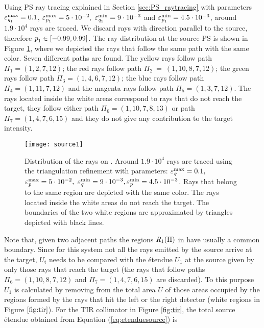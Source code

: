 Using PS ray tracing explained in Section \ref{sec:PS_raytracing} with parameters $\varepsilon_{\textit{q}_1}^{\textrm{max}} = 0.1$, $ \varepsilon_{\textit{p}_1}^\textrm{max} = 5\cdot 10^{-2}, $ $\varepsilon_{\textit{q}_1}^\textrm{min} = 9\cdot 10^{-3}$ and $\varepsilon_{\textit{p}_1}^\textrm{min} = 4.5 \cdot 10^{-3}$, around $1.9 \cdot 10^4$ rays are traced. 
We discard rays with direction parallel to the source, therefore $\textit{p}_1 \in [-0.99, 0.99]$. The ray distribution at the source PS  is shown in Figure \ref{fig:sourcePS}, where we depicted the rays that follow the same path with the same color. Seven different paths are found. The yellow rays follow path $\Pi_1 = (1, 2, 7, 12)$;
   the red rays follow path $\Pi_2 ~= ~(1, 10, 8, 7, 12)$; the green rays follow path $\Pi_3 = (1, 4, 6, 7, 12)$;
   the blue rays follow path $\Pi_4= (1, 11, 7, 12)$ and the magenta rays follow path $\Pi_5= (1, 3, 7, 12)$. The rays located inside the white areas correspond to rays that do not reach the target, they follow either path $\Pi_6 = (1, 10, 7, 8, 13)$ or path $\Pi_7 = (1,4,7,6,15)$ and they do not give any contribution to the target intensity.
\begin{figure}[h]
  \begin{center}
  \texttt{[image: source1]}
  \end{center}
  \caption{Distribution of the rays on . Around $1.9 \cdot 10^4$ rays are traced using the triangulation refinement with parameters:
  $\varepsilon_{\textit{q}}^\textrm{max} = 0.1 ,$ $ \varepsilon_{\textit{p}}^\textrm{max} = 5\cdot 10^{-2}, $ $\varepsilon_{\textit{q}}^\textrm{min} = 9\cdot 10^{-3}, \varepsilon_{\textit{p}}^\textrm{min} = 4.5 \cdot 10^{-3}$. Rays that belong to the same region are depicted with the same color. The rays located inside the white areas do not reach the target. The boundaries of the two white regions are approximated by triangles depicted with black lines.}
  \label{fig:sourcePS}
\end{figure}
Note that, given two adjacent paths the regions $\mbox{$\emph{R}_{\textit{$1$}}$}(\Pi)$ in  have usually a common boundary. 
Since for this system not all the rays emitted by the source arrive at the target, $U_{\textrm{t}}$ needs to be compared with the \'{e}tendue $U_1$ at the source given by only those rays that reach the target (the rays that follow paths $\Pi_6=(1,10,8,7,12)$ and 
$\Pi_7 = (1,4,7,6,15)$ are discarded). To this purpose $U_1$ is calculated by removing from the total area $U$ of  those areas occupied by the regions formed by the rays that hit the left or the right detector (white regions in Figure $\ref{fig:tir}$).  For the TIR collimator in Figure \ref{fig:tir}, the total source  \'{e}tendue obtained from Equation (\ref{eq:etenduesource}) is
